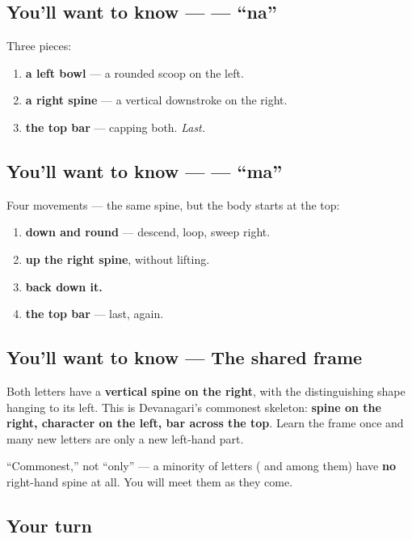 \subsection*{You'll want to know —  — \textquotedblleft{}na\textquotedblright{}}
Three pieces:

\begin{enumerate}
\raggedright
  \item \textbf{a left bowl} — a rounded scoop on the left.
  \item \textbf{a right spine} — a vertical downstroke on the right.
  \item \textbf{the top bar} — capping both. \emph{Last.}
\end{enumerate}

\subsection*{You'll want to know —  — \textquotedblleft{}ma\textquotedblright{}}
Four movements — the same spine, but the body starts at the top:

\begin{enumerate}
\raggedright
  \item \textbf{down and round} — descend, loop, sweep right.
  \item \textbf{up the right spine}, without lifting.
  \item \textbf{back down it.}
  \item \textbf{the top bar} — last, again.
\end{enumerate}

\subsection*{You'll want to know — The shared frame}
Both letters have a \textbf{vertical spine on the right}, with the distinguishing shape hanging to its left. This is Devanagari's commonest skeleton: \textbf{spine on the right, character on the left, bar across the top}. Learn the frame once and many new letters are only a new left-hand part.

\textquotedblleft{}Commonest,\textquotedblright{} not \textquotedblleft{}only\textquotedblright{} — a minority of letters (\textbf{} and \textbf{} among them) have \textbf{no} right-hand spine at all. You will meet them as they come.

\subsection*{Your turn}

